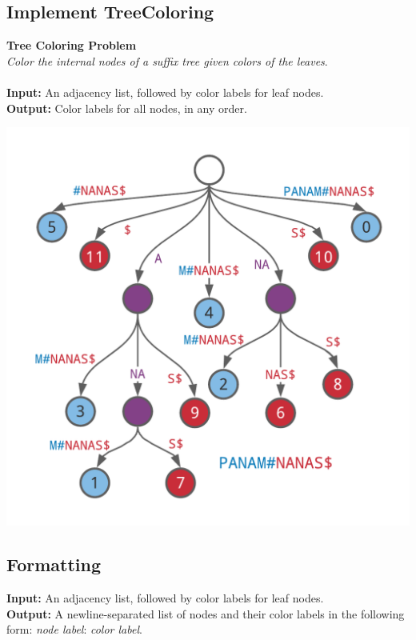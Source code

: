 \documentclass{article}
\begin{document}
\subsection{Implement TreeColoring}
\hline\vspace{5}
\noindent \textbf{Tree Coloring Problem}\\
\emph{Color the internal nodes of a suffix tree given colors of the leaves}.\\ \\
\textbf{Input:} An adjacency list, followed by color labels for leaf nodes. \\
\textbf{Output:} Color labels for all nodes, in any order.
\begin{center}
    \includegraphics[scale=0.2]{c9/logos/9P.png} 
\end{center}
\hline\vspace{5}

\subsection*{Formatting}
\textbf{Input:} An adjacency list, followed by color labels for leaf nodes.\\
\noindent \textbf{Output:} A newline-separated list of nodes and their color labels in the following form: \emph{node label}: \emph{color label}.
\end{document}
